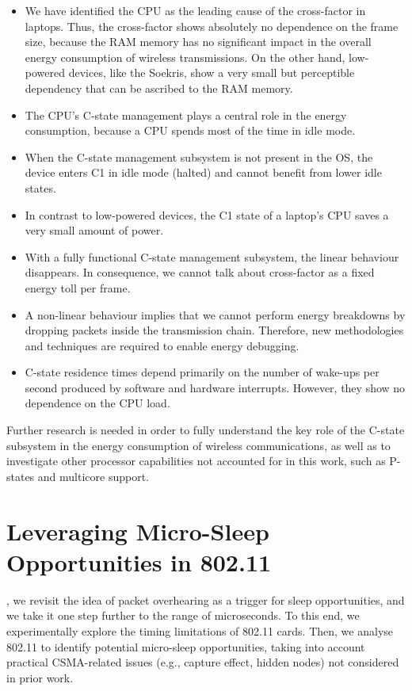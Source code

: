 \documentclass[twoside,nohyper]{tufte-book}
\providecommand{\tightlist}{%
  \setlength{\itemsep}{0pt}\setlength{\parskip}{0pt}}
\begin{document}
\begin{itemize}
\tightlist
\item
  We have identified the CPU as the leading cause of the cross-factor in laptops. Thus, the cross-factor shows absolutely no dependence on the frame size, because the RAM memory has no significant impact in the overall energy consumption of wireless transmissions. On the other hand, low-powered devices, like the Soekris, show a very small but perceptible dependency that can be ascribed to the RAM memory.
\item
  The CPU's C-state management plays a central role in the energy consumption, because a CPU spends most of the time in idle mode.
\item
  When the C-state management subsystem is not present in the OS, the device enters C1 in idle mode (halted) and cannot benefit from lower idle states.
\item
  In contrast to low-powered devices, the C1 state of a laptop's CPU saves a very small amount of power.
\item
  With a fully functional C-state management subsystem, the linear behaviour disappears. In consequence, we cannot talk about cross-factor as a fixed energy toll per frame.
\item
  A non-linear behaviour implies that we cannot perform energy breakdowns by dropping packets inside the transmission chain. Therefore, new methodologies and techniques are required to enable energy debugging.
\item
  C-state residence times depend primarily on the number of wake-ups per second produced by software and hardware interrupts. However, they show no dependence on the CPU load.
\end{itemize}

Further research is needed in order to fully understand the key role of the C-state subsystem in the energy consumption of wireless communications, as well as to investigate other processor capabilities not accounted for in this work, such as P-states and multicore support.

\hypertarget{ch:05}{%
\chapter{Leveraging Micro-Sleep Opportunities in 802.11}\label{ch:05}}

, we revisit the idea of packet overhearing as a trigger for sleep opportunities, and we take it one step further to the range of microseconds. To this end, we experimentally explore the timing limitations of 802.11 cards. Then, we analyse 802.11 to identify potential micro-sleep opportunities, taking into account practical CSMA-related issues (e.g., capture effect, hidden nodes) not considered in prior work.
\end{document}
